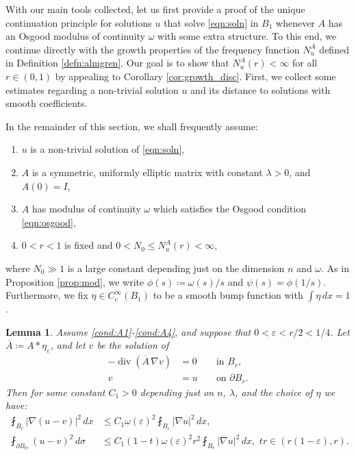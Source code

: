 \documentclass[12pt,leqno]{amsart}
\numberwithin{equation}{section}
\newtheorem{lemma}{Lemma}[section]
\theoremstyle{definition}
\renewcommand{\epsilon}{\varepsilon}
\newcommand{\abs}[1]{\left \lvert #1 \right \rvert}
\newcommand{\ol}{\overline}
\DeclareMathOperator{\divv}{\mathrm{div}}
\begin{document}
	
	With our main tools collected, let us first provide a proof of the unique continuation principle for solutions $u$ that solve \eqref{eqn:soln} in $B_1$ whenever $A$ has an Osgood modulus of continuity $\omega$ with some extra structure. To this end, we continue directly with the growth properties of the frequency function $N_u^A$ defined in Definition \ref{defn:almgren}. Our goal is to show that $N_u^A(r) < \infty$ for all $r \in (0,1)$ by appealing to Corollary \ref{cor:growth_disc}. First, we collect some estimates regarding a non-trivial solution $u$ and its distance to solutions with smooth coefficients.
	
	
	In the remainder of this section, we shall frequently assume:
	\begin{enumerate}[({A}1)]
		\item $u$ is a non-trivial solution of \eqref{eqn:soln}, \label{cond:A1}
		\item $A$ is a symmetric, uniformly elliptic matrix with constant $\lambda >0$, and $A(0) = I$, \label{cond:A2}
		\item $A$ has modulus of continuity $\omega$ which satisfies the Osgood condition \eqref{eqn:osgood}, \label{cond:A3}
		\item $0 < r < 1$ is fixed and $0 < N_0 \le N_u^A(r) < \infty$, \label{cond:A4}
	\end{enumerate}
	where $N_0  \gg 1$ is a large constant depending just on the dimension $n$ and $\omega$. As in Proposition \ref{prop:mod}, we write $\phi(s) \coloneqq \omega(s)/s$ and $\psi(s) = \phi(1/s)$. Furthermore, we fix $\eta \in C_c^\infty(B_1)$ to be a smooth bump function with $\int \eta \,dx = 1$. 
	
	
	\begin{lemma}\label{lem:approx_v}
		Assume \ref{cond:A1}-\ref{cond:A4}, and suppose that $0 < \epsilon < r/2< 1/4$. Let $\ol{A} \coloneqq A * \eta_\epsilon$, and let $v$ be the solution of 
		\begin{equation}\label{eqn:approx_soln}
			\begin{alignedat}{3}
			-\divv(\ol{A} \, \nabla v) & = 0 && \text{ in } B_r,\\
			v & = u && \text{ on } \partial B_r.
			\end{alignedat}
		\end{equation}
		Then for some constant $C_1 >0$ depending just on $n$, $\lambda$, and the choice of $\eta$ we have:
		\begin{align*}
			\fint_{B_r} \abs{ \nabla (u-v) }^2 \, dx & \le C_1 \omega(\epsilon)^2 \fint_{B_r} \abs{\nabla u}^2\, dx , \\
			\fint_{\partial B_{tr}} (u-v)^2 \, d\sigma & \le C_1 (1-t)  \omega(\epsilon)^2 r^2 \fint_{B_r} \abs{\nabla u}^2 \, dx, \, \, tr \in (r(1-\epsilon), r).
		\end{align*} 
	\end{lemma}
	
\end{document}
